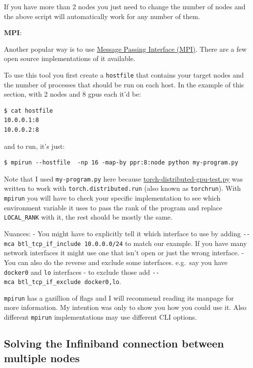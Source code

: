 \documentclass[
]{report}
\begin{document}
If you have more than 2 nodes you just need to change the number of
nodes and the above script will automatically work for any number of
them.

\textbf{MPI}:

Another popular way is to use
\href{https://en.wikipedia.org/wiki/Message_Passing_Interface}{Message
Passing Interface (MPI)}. There are a few open source implementations of
it available.

To use this tool you first create a \texttt{hostfile} that contains your
target nodes and the number of processes that should be run on each
host. In the example of this section, with 2 nodes and 8 gpus each it'd
be:

\begin{verbatim}
$ cat hostfile
10.0.0.1:8
10.0.0.2:8
\end{verbatim}

and to run, it's just:

\begin{verbatim}
$ mpirun --hostfile  -np 16 -map-by ppr:8:node python my-program.py
\end{verbatim}

Note that I used \texttt{my-program.py} here because
\href{./torch-distributed-gpu-test.py}{torch-distributed-gpu-test.py}
was written to work with \texttt{torch.distributed.run} (also known as
\texttt{torchrun}). With \texttt{mpirun} you will have to check your
specific implementation to see which environment variable it uses to
pass the rank of the program and replace \texttt{LOCAL\_RANK} with it,
the rest should be mostly the same.

Nuances: - You might have to explicitly tell it which interface to use
by adding \texttt{-\/-mca\ btl\_tcp\_if\_include\ 10.0.0.0/24} to match
our example. If you have many network interfaces it might use one that
isn't open or just the wrong interface. - You can also do the reverse
and exclude some interfaces. e.g.~say you have \texttt{docker0} and
\texttt{lo} interfaces - to exclude those add
\texttt{-\/-mca\ btl\_tcp\_if\_exclude\ docker0,lo}.

\texttt{mpirun} has a gazillion of flags and I will recommend reading
its manpage for more information. My intention was only to show you how
you could use it. Also different \texttt{mpirun} implementations may use
different CLI options.

\subsection{Solving the Infiniband connection between multiple
nodes}\label{solving-the-infiniband-connection-between-multiple-nodes}
\end{document}
